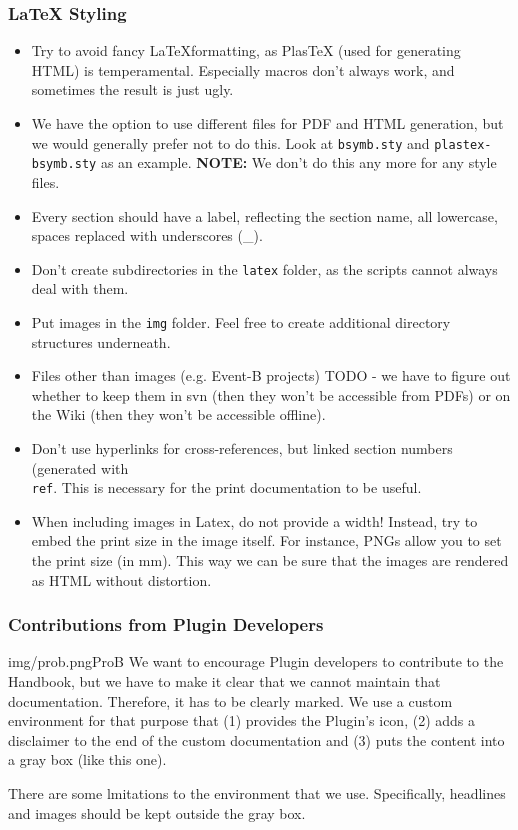 \subsubsection{\LaTeX{} Styling}

\begin{itemize}
	\item Try to avoid fancy \LaTeX formatting, as PlasTeX (used for generating HTML) is temperamental.  Especially macros don't always work, and sometimes the result is just ugly.
	\item We have the option to use different files for PDF and HTML generation, but we would generally prefer not to do this.  Look at \texttt{bsymb.sty} and \texttt{plastex-bsymb.sty} as an example. \textbf{NOTE:} We don't do this any more for any style files.
	\item Every section should have a label, reflecting the section name, all lowercase, spaces replaced with underscores (\_).
	\item Don't create subdirectories in the \texttt{latex} folder, as the scripts cannot always deal with them.
	\item Put images in the \texttt{img} folder.  Feel free to create additional directory structures underneath.
	\item Files other than images (e.g. Event-B projects) TODO - we have to figure out whether to keep them in svn (then they won't be accessible from PDFs) or on the Wiki (then they won't be accessible offline).
	\item Don't use hyperlinks for cross-references, but linked section numbers (generated with \texttt{\\ref{}}.  This is necessary for the print documentation to be useful.
	\item When including images in Latex, do not provide a width!  Instead, try to embed the print size in the image itself.  For instance, PNGs allow you to set the print size (in mm).  This way we can be sure that the images are rendered as HTML without distortion.
\end{itemize}

\subsubsection{Contributions from Plugin Developers}
\label{sec:plugin_contributions}

\begin{rodin-plugin}{img/prob.png}{ProB}
We want to encourage Plugin developers to contribute to the Handbook, but we have to make it clear that we cannot maintain that documentation.  Therefore, it has to be clearly marked.  We use a custom environment for that purpose that
(1) provides the Plugin's icon, (2) adds a disclaimer to the end of the custom documentation and (3) puts the content into a gray box (like this one).

There are some lmitations to the environment that we use.  Specifically, headlines and images should be kept outside the gray box.

\end{rodin-plugin}

